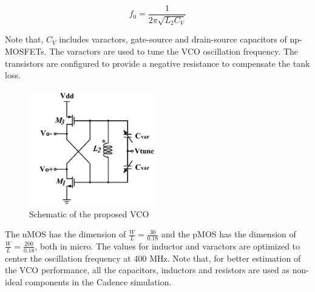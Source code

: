\begin{equation}
f_0 = \frac{1}{2\pi\sqrt{L_2C_V}}
\end{equation}

Note that, $C_V$ includes varactors, gate-source and drain-source capacitors of np-MOSFETs. The varactors are used to tune the VCO oscillation frequency. The transistors are configured to provide a negative resistance to compensate the tank loss. 

\begin{figure}[h]
   \centering
    \includegraphics[width=0.50\textwidth]{figures/VCO.png}
    \caption{Schematic of the proposed VCO}
    \label{fig:vco}
\end{figure}


The nMOS has the dimension of $\frac{W}{L}=\frac{30}{0.18}$ and the pMOS has the dimension of $\frac{W}{L}=\frac{200}{0.18}$, both in micro. The values for inductor and varactors are optimized to center the oscillation frequency at 400 MHz. Note that, for better estimation of the VCO performance, all the capacitors, inductors and resistors are used as non-ideal components in the Cadence simulation. 

